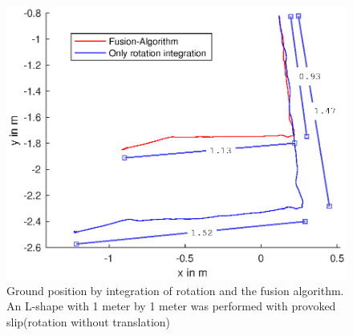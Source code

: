 \documentclass[letterpaper, 10 pt, conference]{ieeeconf}  %
\begin{document}
\begin{figure}
\includegraphics[width=\linewidth]{./graphics/LTest.eps}
\caption{Ground position by integration of rotation and the fusion algorithm. An L-shape with 1 meter by 1 meter was performed with provoked slip(rotation without translation)}
\label{LTest}
\end{figure}
\end{document}
